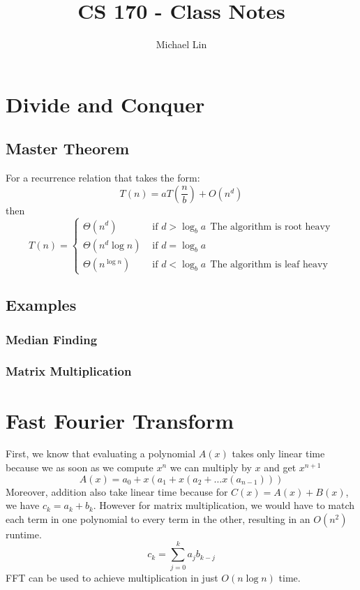 \documentclass[a4paper]{article}
\title{CS 170 - Class Notes}
\author{Michael Lin}
\begin{document}
\maketitle

\section{Divide and Conquer}
\subsection{Master Theorem}
For a recurrence relation that takes the form:
\[ T(n) = aT(\frac{n}{b}) + O(n^d) \]
then
\[ T(n) = \begin{cases}
    \Theta(n^d) & \text{ if } d > \log_b a \ \  \text{The algorithm is root heavy} \\
    \Theta(n^d \log n) & \text{ if } d = \log_b a  \\
    \Theta(n^{\log n}) & \text{ if } d < \log_b a \ \  \text{The algorithm is leaf heavy}
\end{cases} \]
\subsection{Examples}
\subsubsection{Median Finding}
\subsubsection{Matrix Multiplication}

\section{Fast Fourier Transform}

First, we know that evaluating a polynomial $A(x)$ takes only linear time because we as soon as we compute $x^n$ we can multiply by $x$ and get $x^{n+1}$
\begin{equation}
    \tag{Horner's Rule}
    A(x) = a_0 + x(a_1 + x(a_2 + \dots x(a_{n-1})))
\end{equation}
Moreover, addition also take linear time because for $C(x) = A(x) + B(x)$, we have $c_k = a_k + b_k$. However for matrix multiplication, we would have to match 
each term in one polynomial to every term in the other, resulting in an $O(n^2)$ runtime.
\[ c_k = \sum_{j=0}^k a_j b_{k-j} \]
FFT can be used to achieve multiplication in just $O(n \log n)$ time.
\end{document}
